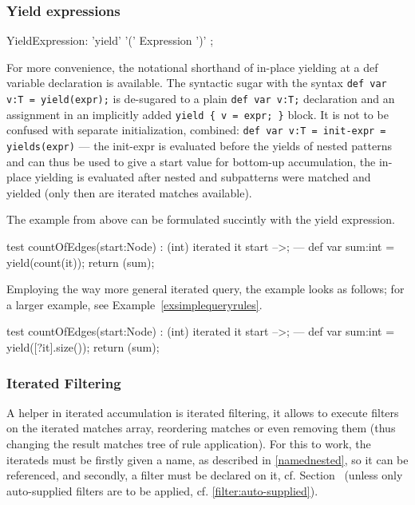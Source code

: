 \subsubsection*{Yield expressions} 

\begin{rail} 
  YieldExpression: 'yield' '(' Expression ')' ;
\end{rail}

For more convenience, the notational shorthand of in-place yielding at a def variable declaration is available.
The syntactic sugar with the syntax \texttt{def var v:T = yield(expr);} is de-sugared to a plain \texttt{def var v:T;} declaration and an assignment in an implicitly added \verb#yield { v = expr; }# block.
It is not to be confused with separate initialization, combined: \texttt{def var v:T = init-expr = yields(expr)} --- the init-expr is evaluated before the yields of nested patterns and can thus be used to give a start value for bottom-up accumulation, the in-place yielding is evaluated after nested and subpatterns were matched and yielded (only then are iterated matches available).

The example from above can be formulated succintly with the yield expression.

\begin{example}
  \begin{grgen}
test countOfEdges(start:Node) : (int)
{
	iterated it {
		start -->;
	} 
---
	def var sum:int = yield(count(it));
	return (sum);
}
  \end{grgen}
\end{example}

Employing the way more general iterated query, the example looks as follows; for a larger example, see Example~\ref{exsimplequeryrules}.

\begin{example}
  \begin{grgen}
test countOfEdges(start:Node) : (int)
{
	iterated it {
		start -->;
	} 
---
	def var sum:int = yield([?it].size());
	return (sum);
}
  \end{grgen}
\end{example}
	
	
\subsubsection*{Iterated Filtering}\label{sub:iteratedfilter}

A helper in iterated accumulation is iterated filtering, it allows to execute filters on the iterated matches array, reordering matches or even removing them (thus changing the result matches tree of rule application).
For this to work, the iterateds must be firstly given a name, as described in \ref{namednested}, so it can be referenced, and secondly, a filter must be declared on it, cf. Section~\label{cardinality} (unless only auto-supplied filters are to be applied, cf. \ref{filter:auto-supplied}).

